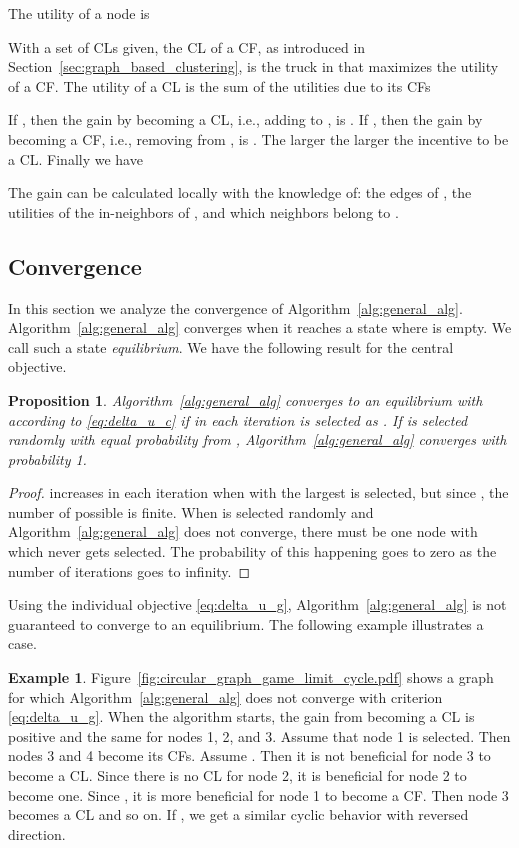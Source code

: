 \documentclass[letterpaper,10pt,conference,twocolumn]{IEEEtran}
\newtheorem{prop}{Proposition}
\theoremstyle{definition}
\newtheorem{example}{Example}
\begin{document}
The utility of a node  is 

With a set of CLs  given, the CL of a CF, as introduced in Section~\ref{sec:graph_based_clustering}, is the truck in  that maximizes the utility of a CF. The utility  of a CL  is the sum of the utilities due to its CFs 

If , then the gain by becoming a CL, i.e., adding  to , is
.
If , then the gain by becoming a CF, i.e., removing  from , is
. The larger  the larger the incentive to be a CL.
Finally we have

The gain  can be calculated locally with the knowledge of: the edges of , the utilities of the in-neighbors of , and which neighbors belong to .
\subsection{Convergence}
In this section we analyze the convergence of Algorithm~\ref{alg:general_alg}. Algorithm~\ref{alg:general_alg} converges when it reaches a state where  is empty. We call such a state \textit{equilibrium}.
We have the following result for the central objective.
\begin{prop}
 Algorithm~\ref{alg:general_alg} converges to an equilibrium with  according to \eqref{eq:delta_u_c} if in each iteration  is selected as . If  is selected randomly with equal probability from , Algorithm~\ref{alg:general_alg} converges with probability 1.
\end{prop}
\begin{proof}
  increases in each iteration when  with the largest  is selected, but since , the number of possible  is finite. When  is selected randomly and Algorithm~\ref{alg:general_alg} does not converge, there must be one node  with  which never gets selected. The probability of this happening goes to zero as the number of iterations goes to infinity.
\end{proof}

Using the individual objective \eqref{eq:delta_u_g}, Algorithm~\ref{alg:general_alg} is not guaranteed to converge to an equilibrium. The following example illustrates a case.
\begin{example}\label{ex:limit_cycle}
 Figure~\ref{fig:circular_graph_game_limit_cycle.pdf} shows a graph  for which Algorithm~\ref{alg:general_alg} does not converge with criterion \eqref{eq:delta_u_g}. When the algorithm starts, the gain from becoming a CL is positive and the same for nodes 1, 2, and 3. Assume that node 1 is selected. Then nodes 3 and 4 become its CFs. Assume . Then it is not beneficial for node 3 to become a CL. Since there is no CL for node 2, it is beneficial for node 2 to become one. Since , it is more beneficial for node 1 to become a CF. Then node 3 becomes a CL and so on. If , we get a similar cyclic behavior with reversed direction.
\end{example}
\end{document}
